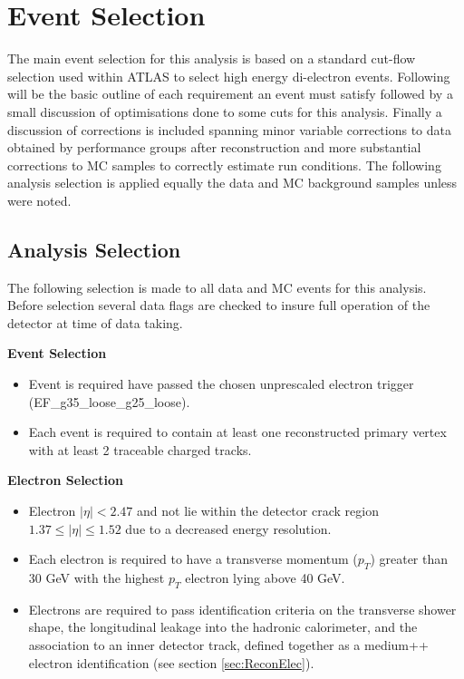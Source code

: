 \chapter{Event Selection}

The main event selection for this analysis is based on a standard cut-flow selection used within ATLAS to select high energy di-electron events. Following will be the basic outline of each requirement an event must satisfy followed by a small discussion of optimisations done to some cuts for this analysis. Finally a discussion of corrections is included spanning minor variable corrections to data obtained by performance groups after reconstruction and more substantial corrections to MC samples to correctly estimate run conditions.
The following analysis selection is applied equally the data and MC background samples unless were noted.


\section{Analysis Selection}

The following selection is made to all data and MC events for this analysis. Before selection several data flags are checked to insure full operation of the detector at time of data taking. 

{\bf Event Selection}
\begin{itemize}
\item Event is required have passed the chosen unprescaled electron trigger (EF\_g35\_loose\_g25\_loose).
\item Each event is required to contain at least one reconstructed primary vertex with at least 2 traceable charged tracks.
\end{itemize}


{\bf Electron Selection}
\begin{itemize}
\item Electron $|\eta| < 2.47$ and not lie within the detector crack region $1.37 \leq |\eta| \leq 1.52$ due to a decreased energy resolution.
\item Each electron is required to have a transverse momentum ($p_{T}$) greater than 30 GeV with the highest $p_{T}$ electron lying above 40 GeV.
\item Electrons are required to pass identification criteria on the transverse shower shape, the longitudinal leakage into the hadronic calorimeter, and the association to an inner detector track, defined together as a medium++ electron identification (see section \ref{sec:ReconElec}).
\end{itemize}


